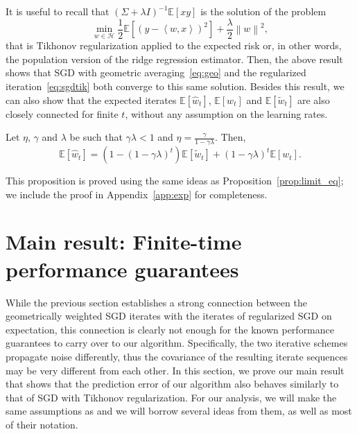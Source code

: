 \documentclass[final,12pt]{colt2018} %
\newcommand{\HH}{\mathcal{H}}
\newcommand{\EE}[1]{\mathbb{E}\left[#1\right]}
\newcommand{\norm}[1]{\left\|#1\right\|}
\newcommand{\pa}[1]{\left(#1\right)}
\newcommand{\wh}{\widehat}
\newcommand{\wt}{\widetilde}
\newcommand{\tw}{\wt{w}}
\newcommand{\hw}{\wh{w}}
\newcommand{\iprod}[2]{\left\langle#1, #2\right\rangle}
\begin{document}
\noindent It is useful to recall that $(\Sigma +\lambda I)^{-1}\EE{xy}$ is the solution of the problem
\[
\min_{w\in\HH } \frac 12 \EE{(y-\iprod{w}{x})^2}+\frac{\lambda}{2} \norm{w}^2,
\]
that is Tikhonov regularization applied to the expected risk or, in other words, the population version of the ridge regression estimator. 
Then, the above result shows that SGD with geometric averaging~\eqref{eq:geo} and the regularized iteration~\eqref{eq:sgdtik} both converge 
to this same solution.
Besides this result, we can also show that the expected iterates $\EE{\hw_t}$, $\EE{w_t}$ and $\EE{\tw_t}$ are also closely connected for 
finite $t$, without any assumption on the learning rates.
\begin{proposition}\label{prop:finite_eq}
 Let $\eta$, $\gamma$ and $\lambda$ be such that $\gamma \lambda < 1$ and $\eta = \frac{\gamma}{1-\gamma\lambda}$. Then, 
 \[
\EE{\hw_t} = \pa{1 - \pa{1-\gamma\lambda}^t} \EE{\tw_t} + (1-\gamma\lambda)^{t} \EE{w_t}.
 \]
\end{proposition}
This proposition is proved using the same ideas as Proposition~\ref{prop:limit_eq}; we include the proof in Appendix~\ref{app:exp} for 
completeness.

\section{Main result: Finite-time performance guarantees}\label{sec:main} 
While the previous section establishes a strong connection between the geometrically weighted SGD iterates with the iterates of regularized 
SGD on expectation, this connection is clearly not enough for the known performance guarantees to carry over to our algorithm. 
Specifically, 
the 
two iterative schemes propagate noise differently, thus the covariance of the resulting iterate sequences may be very different from each 
other. In this section, we prove our main result that shows that the prediction error of our algorithm also behaves similarly to that of 
SGD with Tikhonov regularization. For our analysis, we will make the same assumptions as \citet{DFB16} and we will borrow several 
ideas from them, as well as most of their notation.
\end{document}
